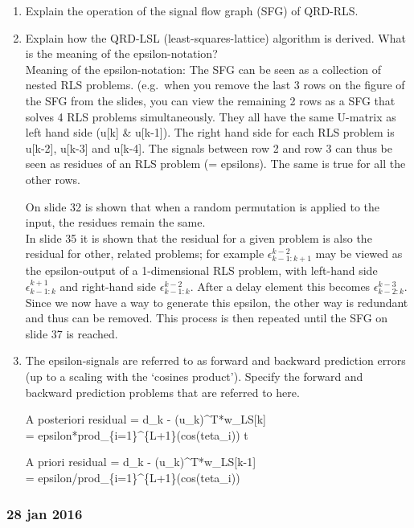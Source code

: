 \documentclass[
  a4paper,
  ,captions=tableheading
]{scrartcl}
\begin{document}
\begin{enumerate}
\def\labelenumi{\arabic{enumi}.}
\item
  Explain the operation of the signal flow graph (SFG) of QRD-RLS.\\
\item
  Explain how the QRD-LSL (least-squares-lattice) algorithm is derived.
  What is the meaning of the epsilon-notation?\\
  Meaning of the epsilon-notation: The SFG can be seen as a collection
  of nested RLS problems. (e.g.~when you remove the last 3 rows on the
  figure of the SFG from the slides, you can view the remaining 2 rows
  as a SFG that solves 4 RLS problems simultaneously. They all have the
  same U-matrix as left hand side (u{[}k{]} \& u{[}k-1{]}). The right
  hand side for each RLS problem is u{[}k-2{]}, u{[}k-3{]} and
  u{[}k-4{]}. The signals between row 2 and row 3 can thus be seen as
  residues of an RLS problem (= epsilons). The same is true for all the
  other rows.

  On slide 32 is shown that when a random permutation is applied to the
  input, the residues remain the same.\\
  In slide 35 it is shown that the residual for a given problem is also
  the residual for other, related problems; for example
  \(\epsilon^{k−2}_{k−1:k+1}\) may be viewed as the epsilon-output of a
  1-dimensional RLS problem, with left-hand side
  \(\epsilon^{k+1}_{k−1:k}\) and right-hand side
  \(\epsilon^{k−2}_{k−1:k}\). After a delay element this becomes
  \(\epsilon^{k-3}_{k-2:k}\). Since we now have a way to generate this
  epsilon, the other way is redundant and thus can be removed. This
  process is then repeated until the SFG on slide 37 is reached.
\item
  The epsilon-signals are referred to as forward and backward prediction
  errors (up to a scaling with the `cosines product'). Specify the
  forward and backward prediction problems that are referred to here.

  A posteriori residual = d\_k - (u\_k)\^{}T*w\_LS{[}k{]}\\
  = epsilon*prod\_\{i=1\}\^{}\{L+1\}(cos(teta\_i)) t

  A priori residual = d\_k - (u\_k)\^{}T*w\_LS{[}k-1{]}\\
  = epsilon/prod\_\{i=1\}\^{}\{L+1\}(cos(teta\_i))
\end{enumerate}

\subsubsection{\texorpdfstring{\textbf{28 jan
2016}}{28 jan 2016}}\label{jan-2016}
\end{document}
